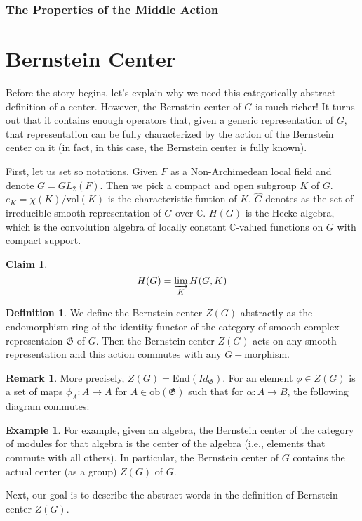 \documentclass[12pt,a4paper,english]{article}
\theoremstyle{plain}
\newtheorem{cla}[thm]{Claim}
\theoremstyle{definition}
\newtheorem{defi}{Definition}
\newtheorem*{ex}{Example}
\newtheorem*{rem}{Remark}
\begin{document}
\subsubsection{The Properties of the Middle Action}
\appendix
\section{Bernstein Center}\label{Bernstein}
Before the story begins, let's explain why we need this categorically abstract definition of a center. However, the Bernstein center of $G$ is much richer! It turns out that it contains enough operators that, given a generic representation of $G$, that representation can be fully characterized by the action of the Bernstein center on it (in fact, in this case, the Bernstein center is fully known).

 First, let us set so notations. Given $F$ as a Non-Archimedean local field and denote $G=GL_{2}(F)$. Then we pick a compact and open subgroup $K$ of $G$. $e_{K}=\chi(K)/\text{vol}(K)$ is the characteristic funtion of $K$. $\hat{G}$ denotes as the set of irreducible smooth representation of $G$ over $\mathbb{C}$. $H(G)$ is the Hecke algebra, which is the convolution algebra of locally constant $\mathbb{C}$-valued functions on $G$ with compact support. 
 \begin{cla}
 \begin{equation*}
     H(G)= \varinjlim_{K} H(G, K)
 \end{equation*}
 \end{cla}
 \begin{defi}
 We define the Bernstein center $Z(G)$ abstractly as the endomorphism ring of the identity functor of the category of smooth complex representaion $\mathfrak{G}$ of $G$. Then the Bernstein center $Z(G)$ acts on any smooth representation and this action commutes with any $G-$morphism. 
 \end{defi}
 \begin{rem}
 More precisely, $Z(G)=\text{End}(Id_{\mathfrak{G}})$. For an element $\phi\in Z(G)$ is a set of maps $\phi_{A}: A\rightarrow A$ for $A\in \text{ob}(\mathfrak{G})$ such that for $\alpha: A\rightarrow B$, the following diagram commutes:
 \begin{center}
 \end{center}
 \end{rem}
\begin{ex}
 For example, given an algebra, the Bernstein center of the category of modules for that algebra is the center of the algebra (i.e., elements that commute with all others). In particular, the Bernstein center of $G$ contains the actual center (as a group) $Z(G)$ of $G$.
\end{ex}
 Next, our goal is to describe the abstract words in the definition of Bernstein center $Z(G)$.
 
\end{document}
